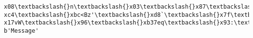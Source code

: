 \documentclass[11pt]{article}
\begin{document}
\begin{Verbatim}[commandchars=\\\{\}]
x08\textbackslash{}n\textbackslash{}x03\textbackslash{}x87\textbackslash{}xc1\textbackslash{}xe2m\textbackslash{}x85\textbackslash{}x94n\textbackslash{}x1dt\textbackslash{}xe0\textbackslash{}xbb\textbackslash{}x0b\textbackslash{}xc4\textbackslash{}xfc\textbackslash{}xde\textbackslash{}xebx\textbackslash{}x0f\textbackslash{}x11\textbackslash{}x93S1\textbackslash{}
xc4\textbackslash{}xbc<Bz'\textbackslash{}xd8`\textbackslash{}x7f\textbackslash{}xfa\textbackslash{}xd0\textbackslash{}x919\textbackslash{}xbb\textbackslash{}xd6H\textbackslash{}x1e\textbackslash{}xaa\textbackslash{}x9b\textbackslash{}xf4\textbackslash{}x94\textbackslash{}xe4\textbackslash{}x18\textbackslash{}x82v\textbackslash{}x1a\textbackslash{}
x17vW\textbackslash{}x96\textbackslash{}xb37eq\textbackslash{}x93:\textbackslash{}x1b\textbackslash{}x8e!\textbackslash{}xea*\textbackslash{}xc7q\textasciitilde{}\textbackslash{}xeb"
b'Message'
    \end{Verbatim}


    
    
    
\end{document}
